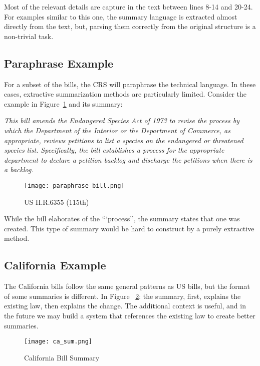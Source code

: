 \documentclass[11pt,a4paper]{article}
\begin{document}
Most of the relevant details are capture in the text between lines 8-14 and 20-24. For examples similar to this one, the summary language is extracted almost directly from the text, but, parsing them correctly from the original structure is a non-trivial task.

\subsection{Paraphrase Example}
For a subset of the bills, the CRS will paraphrase the technical language. In these cases, extractive summarization methods are particularly limited. Consider the example in Figure~\ref{fig:paraphrase} and its summary:

\textit{This bill amends the Endangered Species Act of 1973 to revise the process by which the Department of the Interior or the Department of Commerce, as appropriate, reviews petitions to list a species on the endangered or threatened species list. Specifically, the bill establishes a process for the appropriate department to declare a petition backlog and discharge the petitions when there is a backlog.}\\

\begin{figure}[!h]
    \texttt{[image: paraphrase\_bill.png]}
    \caption{US H.R.6355 (115th)}
    \label{fig:paraphrase}
\end{figure}

While the bill elaborates of the ```process'', the summary states that one was created. This type of summary would be hard to construct by a purely extractive method. 

\subsection{California Example}
\label{appendix:cali}
The California bills follow the same general patterns as US bills, but the format of some summaries is different. In Figure ~\ref{fig:cabill}: the summary, first, explains the existing law, then explains the change. The additional context is useful, and in the future we may build a system that references the existing law to create better summaries. 

\begin{figure}[!h]
    \texttt{[image: ca\_sum.png]}
    \caption{California Bill Summary}
    \label{fig:cabill}
\end{figure}
\end{document}
